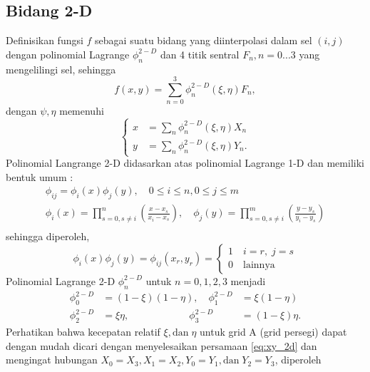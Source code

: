 \begin{spacing}{1.5}
\subsection[Bidang 2-D]{Bidang 2-D}
	Definisikan fungsi $f$ sebagai suatu bidang yang diinterpolasi dalam sel $(i,j)$ dengan polinomial Lagrange $\phi_n^{2-D}$ dan 4 titik sentral $F_n, n=0...3$ yang mengelilingi sel, sehingga
	\begin{equation}
		f(x,y)=\sum_{n=0}^{3}\phi_n^{2-D}(\xi,\eta)F_n, 
	\end{equation}
	dengan $\psi, \eta$ memenuhi  
	\begin{equation}\label{eq:xy_2d}
		\begin{cases}
			x &= \sum_n \phi_n^{2-D}(\xi,\eta)X_n \\
			y &= \sum_n \phi_n^{2-D}(\xi,\eta)Y_n.
		\end{cases}	
	\end{equation}
	Polinomial Langrange 2-D didasarkan atas polinomial Lagrange 1-D dan memiliki bentuk umum :
	\begin{equation*}
		\begin{aligned}
			\phi_{ij} = \phi_i (x) \phi_j (y), \quad 0 \leq i \leq n, 0 \leq j \leq m \\
			\phi_i (x) = \prod_{s=0,s\neq i}^n \left(\frac{x-x_s}{x_i-x_s}\right), \quad \phi_j (y) = \prod_{s=0,s\neq i}^m \left(\frac{y-y_s}{y_i-y_s}\right) \\	
		\end{aligned}
	\end{equation*}
	sehingga diperoleh, 
	\begin{equation*}
		\phi_i (x) \phi_j (y) = \phi_{ij} (x_r,y_r)=
		\begin{cases}
			1	\quad	i=r,\;j=s \\
			0	\quad	\text{lainnya}
		\end{cases}
	\end{equation*}
	Polinomial Lagrange 2-D $\phi_n^{2-D}$ untuk $n=0,1,2,3$ menjadi
	\begin{equation*}
		\begin{aligned}
			\phi_0^{2-D} &= (1-\xi)(1-\eta), \quad 	\phi_1^{2-D} &= \xi(1-\eta) \\
			\phi_2^{2-D} &= \xi\eta, \quad 	\quad \quad \quad \quad \quad \phi_3^{2-D} &= (1-\xi)\eta.
		\end{aligned}
	\end{equation*}
	Perhatikan bahwa kecepatan relatif $\xi,\text{dan}\;\eta$ untuk grid A (grid persegi) dapat dengan mudah dicari dengan menyelesaikan persamaan \ref{eq:xy_2d} dan mengingat hubungan $X_0=X_3,X_1=X_2,Y_0=Y_1,\text{dan} \;Y_2=Y_3$, diperoleh  

\end{spacing}

